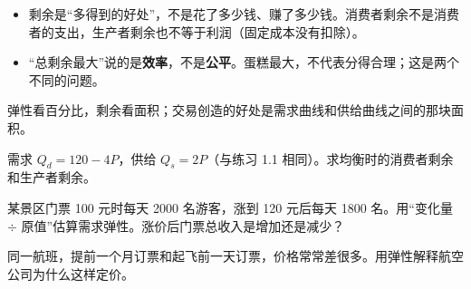 \begin{pitfall}
\begin{itemize}
  \item 剩余是“多得到的好处”，不是花了多少钱、赚了多少钱。消费者剩余不是消费者的支出，生产者剩余也不等于利润（固定成本没有扣除）。
  \item “总剩余最大”说的是\textbf{效率}，不是\textbf{公平}。蛋糕最大，不代表分得合理；这是两个不同的问题。
\end{itemize}
\end{pitfall}

\begin{oneline}
弹性看百分比，剩余看面积；交易创造的好处是需求曲线和供给曲线之间的那块面积。
\end{oneline}

\begin{exercises}[练一练]
  \item 需求 $Q_d=120-4P$，供给 $Q_s=2P$（与练习 1.1 相同）。求均衡时的消费者剩余和生产者剩余。
  \item 某景区门票 100 元时每天 2000 名游客，涨到 120 元后每天 1800 名。用“变化量 $\div$ 原值”估算需求弹性。涨价后门票总收入是增加还是减少？
  \item 同一航班，提前一个月订票和起飞前一天订票，价格常常差很多。用弹性解释航空公司为什么这样定价。
\end{exercises}
